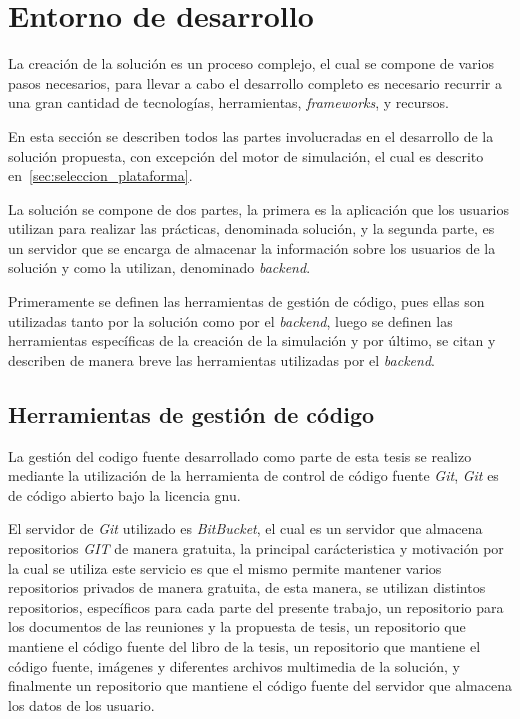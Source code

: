 \section{Entorno de desarrollo}

La creación de la solución es un proceso complejo, el cual se compone de varios
pasos necesarios, para llevar a cabo el desarrollo completo es necesario recurrir
a una gran cantidad de tecnologías, herramientas, \textit{frameworks}, y
recursos.

En esta sección se describen todos las partes involucradas en el desarrollo de
la solución propuesta, con excepción del motor de simulación, el cual es
descrito en~\ref{sec:seleccion_plataforma}.

La solución se compone de dos partes, la primera es la aplicación que los
usuarios utilizan para realizar las prácticas, denominada solución, y la segunda
parte, es un servidor que se encarga de almacenar la información sobre los
usuarios de la solución y como la utilizan, denominado \textit{backend}.

Primeramente se definen las herramientas de gestión de código, pues ellas son
utilizadas tanto por la solución como por el \textit{backend}, luego se definen
las herramientas específicas de la creación de la simulación y por último, se
citan y describen de manera breve las herramientas utilizadas por el
\textit{backend}.

\subsection{Herramientas de gestión de código}

La gestión del codigo fuente desarrollado como parte de esta tesis se realizo
mediante la utilización de la herramienta de control de código fuente
\textit{Git}\cite{git}, \textit{Git} es de código abierto bajo la licencia
\Gls{gnu}.

El servidor de \textit{Git} utilizado es \textit{BitBucket}\cite{bitbucket}, el
cual es un servidor que almacena repositorios \textit{GIT} de manera gratuita,
la principal carácteristica y motivación por la cual se utiliza este servicio es
que el mismo permite mantener varios repositorios privados de manera
gratuita\cite{bitbucket}, de esta manera, se utilizan distintos repositorios,
específicos para cada parte del presente trabajo, un repositorio para los
documentos de las reuniones y la propuesta de tesis, un repositorio que mantiene
el código fuente del libro de la tesis, un repositorio que mantiene el código
fuente, imágenes y diferentes archivos multimedia de la solución, y finalmente
un repositorio que mantiene el código fuente del servidor que almacena los datos
de los usuario.


